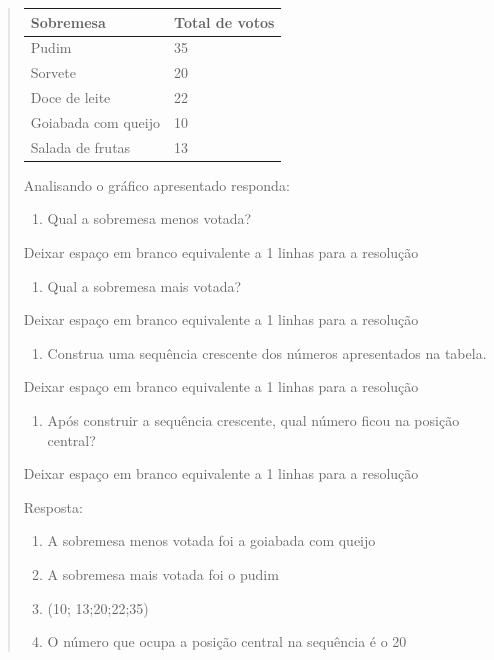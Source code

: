\begin{enumerate}
\begin{escolha}
\begin{enumerate}
\begin{itemize}
\begin{itemize}
\begin{escolha}
\begin{quote}
\begin{escolha}
{\begin{longtable}[]{@{}ll@{}}
\toprule
Sobremesa & Total de votos\tabularnewline
\midrule
\endhead
Pudim & 35\tabularnewline
Sorvete & 20\tabularnewline
Doce de leite & 22\tabularnewline
Goiabada com queijo & 10\tabularnewline
Salada de frutas & 13\tabularnewline
\bottomrule
\end{longtable}

Analisando o gráfico apresentado responda:

\begin{enumerate}
\def\labelenumi{\alph{enumi})}
\item
  Qual a sobremesa menos votada?
\end{enumerate}

Deixar espaço em branco equivalente a 1 linhas para a resolução

\begin{enumerate}
\def\labelenumi{\alph{enumi})}
\item
  Qual a sobremesa mais votada?
\end{enumerate}

Deixar espaço em branco equivalente a 1 linhas para a resolução

\begin{enumerate}
\def\labelenumi{\alph{enumi})}
\item
  Construa uma sequência crescente dos números apresentados na tabela.
\end{enumerate}

Deixar espaço em branco equivalente a 1 linhas para a resolução

\begin{enumerate}
\def\labelenumi{\alph{enumi})}
\item
  Após construir a sequência crescente, qual número ficou na posição
  central?
\end{enumerate}

Deixar espaço em branco equivalente a 1 linhas para a resolução

Resposta:

\begin{enumerate}
\def\labelenumi{\alph{enumi})}
\item
  A sobremesa menos votada foi a goiabada com queijo
\item
  A sobremesa mais votada foi o pudim
\item
  (10; 13;20;22;35)
\item
  O número que ocupa a posição central na sequência é o 20
\end{enumerate}

}
\end{escolha}
\end{quote}
\end{escolha}
\end{itemize}
\end{itemize}
\end{enumerate}
\end{escolha}
\end{enumerate}
